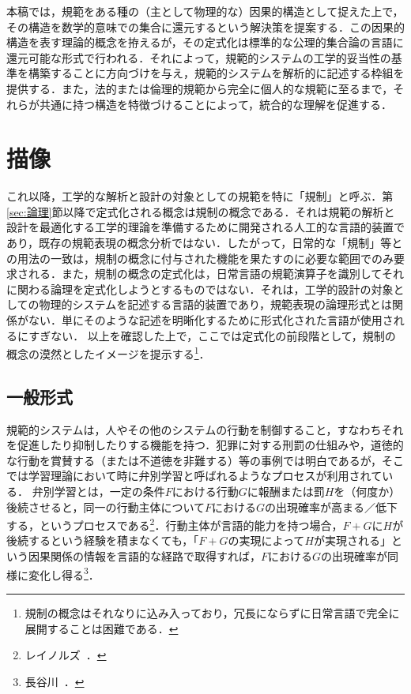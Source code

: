 本稿では，規範をある種の（主として物理的な）因果的構造として捉えた上で，その構造を数学的意味での集合に還元するという解決策を提案する．この因果的構造を表す理論的概念を拵えるが，その定式化は標準的な公理的集合論の言語に還元可能な形式で行われる．それによって，規範的システムの工学的妥当性の基準を構築することに方向づけを与え，規範的システムを解析的に記述する枠組を提供する．また，法的または倫理的規範から完全に個人的な規範に至るまで，それらが共通に持つ構造を特徴づけることによって，統合的な理解を促進する．

\section{描像}

これ以降，工学的な解析と設計の対象としての規範を特に「規制」と呼ぶ．第 \ref{sec:論理}節以降で定式化される概念は規制の概念である．それは規範の解析と設計を最適化する工学的理論を準備するために開発される人工的な言語的装置であり，既存の規範表現の概念分析ではない．したがって，日常的な「規制」等との用法の一致は，規制の概念に付与された機能を果たすのに必要な範囲でのみ要求される．また，規制の概念の定式化は，日常言語の規範演算子を識別してそれに関わる論理を定式化しようとするものではない．それは，工学的設計の対象としての物理的システムを記述する言語的装置であり，規範表現の論理形式とは関係がない．単にそのような記述を明晰化するために形式化された言語が使用されるにすぎない．
以上を確認した上で，ここでは定式化の前段階として，規制の概念の漠然としたイメージを提示する\footnote{規制の概念はそれなりに込み入っており，冗長にならずに日常言語で完全に展開することは困難である．}．

\subsection{一般形式}

規範的システムは，人やその他のシステムの行動を制御すること，すなわちそれを促進したり抑制したりする機能を持つ．犯罪に対する刑罰の仕組みや，道徳的な行動を賞賛する（または不道徳を非難する）等の事例では明白であるが，そこでは学習理論において時に弁別学習と呼ばれるようなプロセスが利用されている．
弁別学習とは，一定の条件$F$における行動$G$に報酬または罰$H$を（何度か）後続させると，同一の行動主体について$F$における$G$の出現確率が高まる／低下する，というプロセスである\footnote{レイノルズ~\cite[pp.\,9--12]{レイノルズ}．}．行動主体が言語的能力を持つ場合，$F+G$に$H$が後続するという経験を積まなくても，「$F+G$の実現によって$H$が実現される」という因果関係の情報を言語的な経路で取得すれば，$F$における$G$の出現確率が同様に変化し得る\footnote{長谷川~\cite[pp.\,4]{長谷川}．}．

